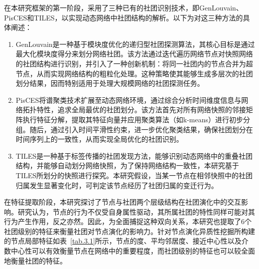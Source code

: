在本研究框架的第一阶段，采用了三种已有的社团识别技术，即GenLouvain、PisCES和TILES，以实现动态网络中社团结构的解析。以下为对这三种方法的具体阐述：

\begin{enumerate}
\item GenLouvain是一种基于模块度优化的递归型社团探测算法，其核心目标是通过最大化模块度得分来划分网络社团。该方法通过迭代遍历网络节点对快照网络的社团结构进行识别，并引入了一种创新机制：将同一社团内的节点合并为超节点，从而实现网络结构的粗粒化处理。这种策略使其能够生成多层次的社团划分结果，因而特别适用于处理大规模网络的社团探测任务。

\item PisCES将谱聚类技术扩展至动态网络环境，通过综合分析时间维度信息与网络拓扑特性，追求全局最优的社团划分。该方法首先对所有网络快照的邻接矩阵执行特征分解，提取其特征向量并应用聚类算法（如k-means）进行初步分组。随后，通过引入时间平滑性约束，进一步优化聚类结果，确保社团划分在时间序列上的一致性，从而实现全局优化的社团识别。

\item TILES是一种基于标签传播的社团发现方法，能够识别动态网络中的重叠社团结构，并能够自动划分网络快照，为了保持网络结构一致性，本研究基于TILES所划分的快照进行探究。本研究假设，当某一节点在相邻快照中的社团归属发生显著变化时，可判定该节点经历了社团归属的变迁行为。
\end{enumerate}




在特征提取阶段，本研究探讨了节点与社团两个层级结构在社团演化中的交互影响。研究认为，节点的行为不仅受自身属性驱动，其所属社团的特性同样可能对其行为产生作用，反之亦然。因此，为全面捕捉这种双向关系，本研究也提取了$6$个社团级别的特征来衡量社团对节点演化的影响力。针对节点演化异质性挖掘所构建的节点局部特征如表~\ref{tab.3.1}所示，节点的度、平均邻居度、接近中心性以及介数中心性可以有效衡量节点在网络中的重要程度，而社团级别的特征也可以较全面地衡量社团的特征。


